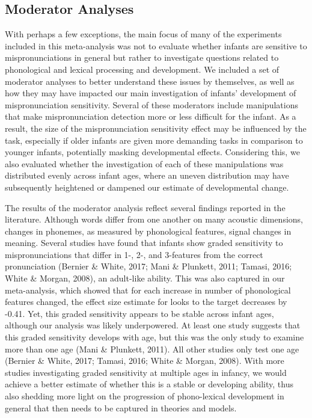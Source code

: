 \documentclass[man]{apa6}
\begin{document}
\hypertarget{moderator-analyses-1}{%
\subsection{Moderator Analyses}\label{moderator-analyses-1}}

With perhaps a few exceptions, the main focus of many of the experiments included in this meta-analysis was not to evaluate whether infants are sensitive to mispronunciations in general but rather to investigate questions related to phonological and lexical processing and development. We included a set of moderator analyses to better understand these issues by themselves, as well as how they may have impacted our main investigation of infants' development of mispronunciation sensitivity. Several of these moderators include manipulations that make mispronunciation detection more or less difficult for the infant. As a result, the size of the mispronunciation sensitivity effect may be influenced by the task, especially if older infants are given more demanding tasks in comparison to younger infants, potentially masking developmental effects. Considering this, we also evaluated whether the investigation of each of these manipulations was distributed evenly across infant ages, where an uneven distribution may have subsequently heightened or dampened our estimate of developmental change.

The results of the moderator analysis reflect several findings reported in the literature. Although words differ from one another on many acoustic dimensions, changes in phonemes, as measured by phonological features, signal changes in meaning. Several studies have found that infants show graded sensitivity to mispronunciations that differ in 1-, 2-, and 3-features from the correct pronunciation (Bernier \& White, 2017; Mani \& Plunkett, 2011; Tamasi, 2016; White \& Morgan, 2008), an adult-like ability. This was also captured in our meta-analysis, which showed that for each increase in number of phonological features changed, the effect size estimate for looks to the target decreases by -0.41. Yet, this graded sensitivity appears to be stable across infant ages, although our analysis was likely underpowered. At least one study suggests that this graded sensitivity develops with age, but this was the only study to examine more than one age (Mani \& Plunkett, 2011). All other studies only test one age (Bernier \& White, 2017; Tamasi, 2016; White \& Morgan, 2008). With more studies investigating graded sensitivity at multiple ages in infancy, we would achieve a better estimate of whether this is a stable or developing ability, thus also shedding more light on the progression of phono-lexical development in general that then needs to be captured in theories and models.
\end{document}
